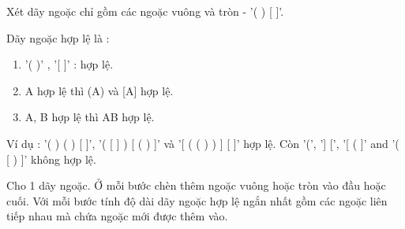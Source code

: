 Xét dãy ngoặc chỉ gồm các ngoặc vuông và tròn - '( ) [ ]'.

Dãy ngoặc hợp lệ là :
\begin{enumerate}
	\item '( )' , '[ ]' : hợp lệ.
	\item A hợp lệ thì (A) và [A] hợp lệ.
	\item A, B hợp lệ thì AB hợp lệ.
\end{enumerate}

Ví dụ : '( ) ( ) [ ]', '( [ ] ) [ ( ) ]' và '[ ( ( ) ) ] [ ]' hợp lệ. Còn '(', '] [', '[ ( ]' and '( [ ) ]' không hợp lệ.

Cho 1 dãy ngoặc. Ở mỗi bước chèn thêm ngoặc vuông hoặc tròn vào đầu hoặc cuối. Với mỗi bước tính độ dài dãy ngoặc hợp lệ ngắn nhất gồm các ngoặc liên tiếp nhau mà chứa ngoặc mới được thêm vào.